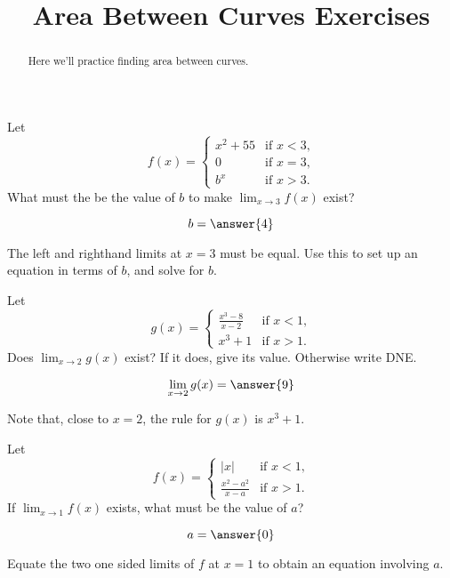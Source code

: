 \documentclass[handout]{ximera}
\title[Exercises:]{Area Between Curves Exercises}
\begin{document}
\begin{abstract}
  Here we'll practice finding area between curves.
\end{abstract}
\maketitle

\begin{exercise}
Let
\[
f(x) =
\begin{cases} x^2+55 &\text{if $x<3$,}\\
  0 &\text{if $x=3$,} \\
  b^x &\text{if $x>3$.}
\end{cases}
\]  
What must the be the value of $b$ to make $\lim_{x \to 3} f(x)$ exist?
\begin{prompt}
\[
b = \answer{4}
\]
\end{prompt}
\begin{hint}
  The left and righthand limits at $x=3$ must be equal.  Use this to
  set up an equation in terms of $b$, and solve for $b$.
\end{hint}
\end{exercise}

\begin{exercise}
Let
\[
g(x) = \begin{cases}
  \frac{x^3 - 8}{x-2}  &\text{if $x<1$,} \\
  x^3+1 &\text{if  $x>1$.}
\end{cases}
\]
Does $\lim_{x \to 2} g(x)$ exist?  If it does, give its value.
Otherwise write DNE.
\begin{prompt}
\[
\lim_{x \to 2} g(x) = \answer{9}
\]
\end{prompt}
\begin{hint}
	Note that, close to $x=2$, the rule for $g(x)$ is $x^3+1$.
\end{hint}

\end{exercise}


\begin{exercise}
Let
\[
f(x) = \begin{cases}
  |x| &\text{if $x<1$,} \\
  \frac{x^2-a^2}{x-a} &\text{if $x>1$.}
\end{cases}
\]
If $\lim_{x \to 1} f(x)$ exists, what must be the value of $a$?
\begin{prompt}
  \[
a = \answer{0}
\]
\end{prompt}
\begin{hint}
  Equate the two one sided limits of $f$ at $x=1$ to obtain an equation involving $a$.
\end{hint}

\end{exercise}
\end{document}
